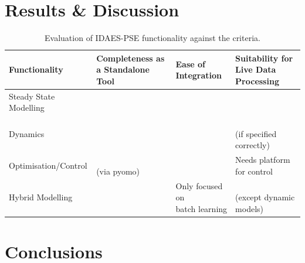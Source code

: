 \documentclass[12pt]{article}
\newcommand{\cmark}{\ding{51}}%
\begin{document}


\section{Results \& Discussion}


\begin{table}[h]
    \centering
    \begin{tabular}{|l|p{}|p{}|p{}|}
        \hline
        \textbf{Functionality} & \textbf{Completeness as a Standalone Tool} & \textbf{Ease of Integration} & \textbf{Suitability for Live Data Processing} \\
        \hline
        Steady State Modelling & \hfil \cmark & \hfil \cmark & \hfil \cmark \\ \hline
        Dynamics & \hfil \cmark & \hfil \cmark  & \makecell{\cmark \\\footnotesize{(if specified correctly)} } \\\hline
        Optimisation/Control & \makecell{\cmark \\\footnotesize{(via pyomo)} } & \hfil \cmark & \makecell{ \footnotesize{Needs platform} \\\footnotesize{for control}} \\\hline
        Hybrid Modelling & \hfil \cmark & \makecell{ \footnotesize{Only focused on }\\\footnotesize{batch learning}} & \makecell{\cmark \\\footnotesize{(except dynamic models)} } \\
        \hline
    \end{tabular}
    \caption{Evaluation of IDAES-PSE functionality against the criteria.}
    \label{tab:results}
\end{table}



\section{Conclusions}
\end{document}
